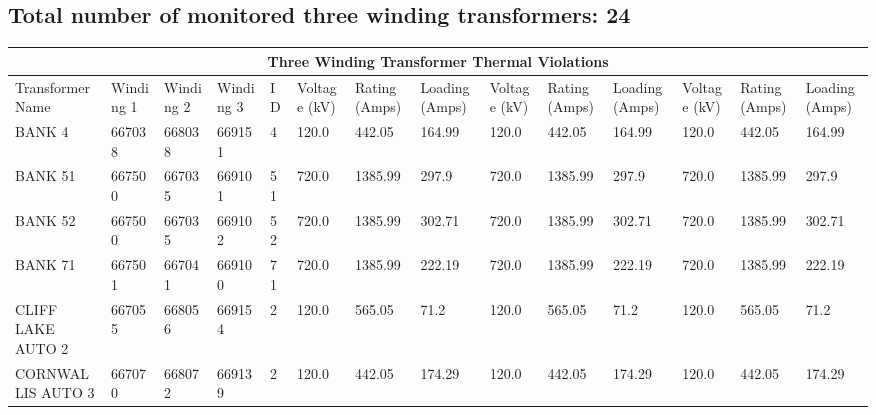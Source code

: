 \documentclass{article}%
\begin{document}
\subsection*{Total number of monitored three winding transformers: 24}%
\label{subsec:Totalnumberofmonitoredthreewindingtransformers24}%
\begin{tabularx}{\textwidth}{| p{1.7cm} | X | X | X |p{0.3cm} | X | X | X | X | X | X | X | X | X |}%
\hline%
\multicolumn{14}{|c|}{Three Winding Transformer Thermal Violations}\\%
\hline%
Transformer Name&Winding 1&Winding 2&Winding 3&ID&Voltage (kV)&Rating (Amps)&Loading (Amps)&Voltage (kV)&Rating (Amps)&Loading (Amps)&Voltage (kV)&Rating (Amps)&Loading (Amps)\\%
\hline%
BANK 4&667038&668038&669151&4&120.0&442.05&164.99&120.0&442.05&164.99&120.0&442.05&164.99\\%
\hline%
\hline%
BANK 51&667500&667035&669101&51&720.0&1385.99&297.9&720.0&1385.99&297.9&720.0&1385.99&297.9\\%
\hline%
\hline%
BANK 52&667500&667035&669102&52&720.0&1385.99&302.71&720.0&1385.99&302.71&720.0&1385.99&302.71\\%
\hline%
\hline%
BANK 71&667501&667041&669100&71&720.0&1385.99&222.19&720.0&1385.99&222.19&720.0&1385.99&222.19\\%
\hline%
\hline%
CLIFF LAKE AUTO 2&667055&668056&669154&2&120.0&565.05&71.2&120.0&565.05&71.2&120.0&565.05&71.2\\%
\hline%
\hline%
CORNWALLIS AUTO 3&667070&668072&669139&2&120.0&442.05&174.29&120.0&442.05&174.29&120.0&442.05&174.29\\%
\hline%
\end{tabularx}

%
\end{document}
